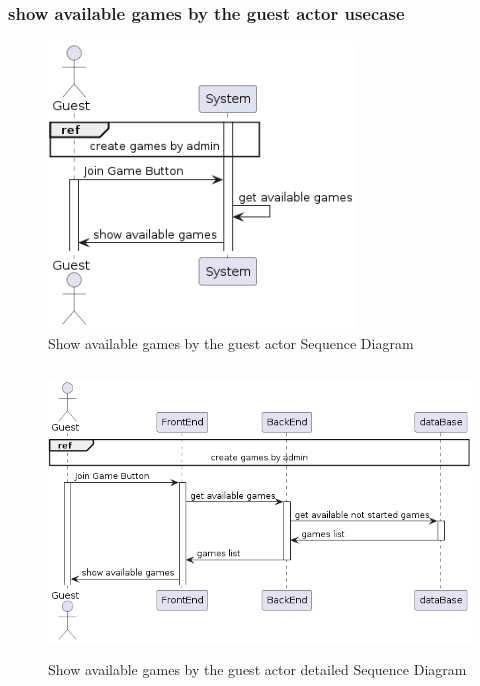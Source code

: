 \documentclass{article}
\begin{document}
\subsubsection{show available games by the guest actor usecase}
 \begin{figure}[H]
	 \centering
	 \includegraphics[height=3in]{../thesis_tex/assets/diagrams/guest_show_available_games_SD.png}
	 \caption{Show available games by the guest actor Sequence Diagram}
\end{figure}

 \begin{figure}[H]
	 \centering
	 \includegraphics[height=3in]{../thesis_tex/assets/diagrams/guest_show_available_games_detailedSD.png}
	 \caption{Show available games by the guest actor detailed Sequence Diagram}
\end{figure}
\end{document}
